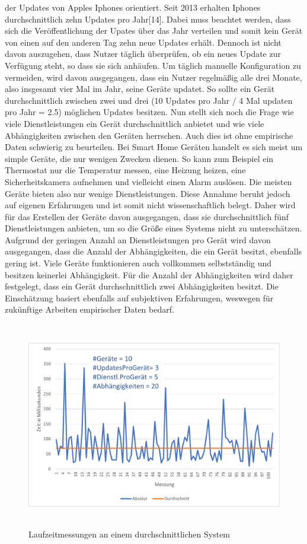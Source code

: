 der Updates von Apples Iphones orientiert. Seit 2013 erhalten Iphones durchschnittlich zehn Updates pro Jahr[14]. Dabei muss beachtet werden, dass sich die
Veröffentlichung der
Upates über das Jahr verteilen und somit kein Gerät von einen auf den anderen Tag zehn neue Updates erhält. Dennoch ist nicht davon auszugehen,
dass Nutzer täglich überprüfen, ob ein neues Update zur Verfügung steht, so dass sie sich anhäufen. Um täglich manuelle Konfiguration zu vermeiden,
wird davon ausgegangen, dass ein Nutzer regelmäßig alle drei Monate, also insgesamt vier Mal im Jahr, seine Geräte updatet. So sollte ein Gerät durchschnittlich
zwischen zwei und drei (10 Updates pro Jahr / 4 Mal updaten pro Jahr = 2.5)  möglichen Updates besitzen. 
Nun stellt sich noch die Frage wie viele Dienstleistungen
ein Gerät durchschnittlich anbietet und wie viele Abhängigkeiten zwischen den Geräten herrschen. Auch dies ist ohne empirische Daten schwierig zu beurteilen.
Bei Smart Home Geräten handelt es sich meist um simple Geräte, die nur wenigen Zwecken dienen. So kann zum Beispiel ein Thermostat nur die Temperatur messen,
eine Heizung heizen, eine Sicherheitskamera aufnehmen und vielleicht einen Alarm auslösen. Die meisten Geräte bieten also nur wenige Dienstleistungen. Diese
Annahme beruht jedoch auf eigenen Erfahrungen und ist somit nicht wissenschaftlich belegt. Daher wird für das Erstellen der Geräte davon ausgegangen, dass sie durchschnittlich
fünf Dienstleistungen anbieten, um so die Größe eines Systems nicht zu unterschätzen. Aufgrund der geringen Anzahl an Dienstleistungen pro Gerät wird davon ausgegangen,
dass die Anzahl der Abhängigkeiten, die ein Gerät besitzt, ebenfalls gering ist. Viele Geräte funktionieren auch vollkommen selbstständig und besitzen keinerlei
Abhängigkeit. Für die Anzahl der Abhängigkeiten wird daher festgelegt, dass ein Gerät durchschnittlich zwei Abhängigkeiten besitzt. Die Einschätzung basiert ebenfalls auf subjektiven
Erfahrungen, weswegen für zukünftige Arbeiten empirischer Daten bedarf.
\begin{figure}[h]
\begin{center}
\includegraphics[width=14cm,height=9cm]{"images/Durchschnitt"}
\caption{Laufzeitmessungen an einem durchschnittlichen System}
\label{fig:Prob1:MEA}
\end{center}
\end{figure}
